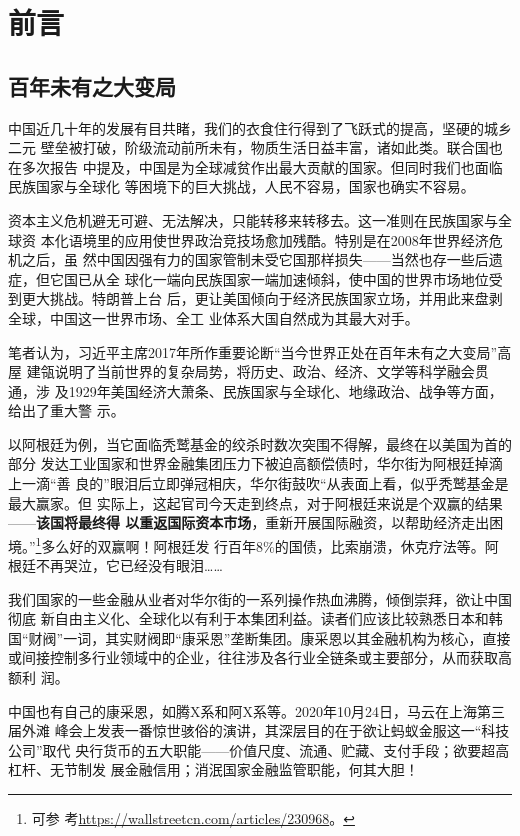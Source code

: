 \chapter{前言}

\section{百年未有之大变局}

中国近几十年的发展有目共睹，我们的衣食住行得到了飞跃式的提高，坚硬的城乡二元
壁垒被打破，阶级流动前所未有，物质生活日益丰富，诸如此类。联合国也在多次报告
中提及，中国是为全球减贫作出最大贡献的国家。但同时我们也面临民族国家与全球化
等困境下的巨大挑战，人民不容易，国家也确实不容易。

资本主义危机避无可避、无法解决，只能转移来转移去。这一准则在民族国家与全球资
本化语境里的应用使世界政治竞技场愈加残酷。特别是在2008年世界经济危机之后，虽
然中国因强有力的国家管制未受它国那样损失——当然也存一些后遗症，但它国已从全
球化一端向民族国家一端加速倾斜，使中国的世界市场地位受到更大挑战。特朗普上台
后，更让美国倾向于经济民族国家立场，并用此来盘剥全球，中国这一世界市场、全工
业体系大国自然成为其最大对手。

笔者认为，习近平主席2017年所作重要论断“当今世界正处在百年未有之大变局”高屋
建瓴说明了当前世界的复杂局势，将历史、政治、经济、文学等科学融会贯通，涉
及1929年美国经济大萧条、民族国家与全球化、地缘政治、战争等方面，给出了重大警
示。

以阿根廷为例，当它面临秃鹫基金的绞杀时数次突围不得解，最终在以美国为首的部分
发达工业国家和世界金融集团压力下被迫高额偿债时，华尔街为阿根廷掉滴上一滴“善
良的”眼泪后立即弹冠相庆，华尔街鼓吹“从表面上看，似乎秃鹫基金是最大赢家。但
实际上，这起官司今天走到终点，对于阿根廷来说是个双赢的结果——\textbf{该国将最终得
  以重返国际资本市场}，重新开展国际融资，以帮助经济走出困境。”\footnote{可参
  考\url{https://wallstreetcn.com/articles/230968}。}多么好的双赢啊！阿根廷发
行百年8\%的国债，比索崩溃，休克疗法等。阿根廷不再哭泣，它已经没有眼泪……

我们国家的一些金融从业者对华尔街的一系列操作热血沸腾，倾倒崇拜，欲让中国彻底
新自由主义化、全球化以有利于本集团利益。读者们应该比较熟悉日本和韩
国“财阀”一词，其实财阀即“康采恩”垄断集团。康采恩以其金融机构为核心，直接
或间接控制多行业领域中的企业，往往涉及各行业全链条或主要部分，从而获取高额利
润。

中国也有自己的康采恩，如腾X系和阿X系等。2020年10月24日，马云在上海第三届外滩
峰会上发表一番惊世骇俗的演讲，其深层目的在于欲让蚂蚁金服这一“科技公司”取代
央行货币的五大职能——价值尺度、流通、贮藏、支付手段；欲要超高杠杆、无节制发
展金融信用；消泯国家金融监管职能，何其大胆！

